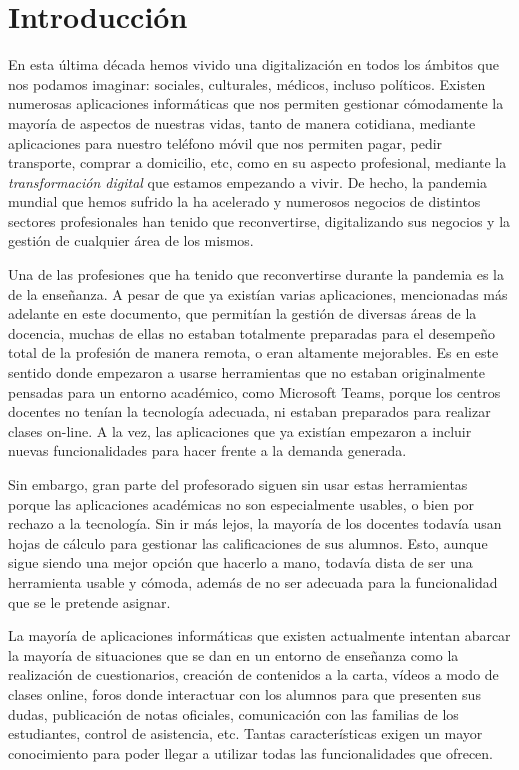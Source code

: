 
\chapter{Introducción}
\label{cap:Introduccion}
En esta última década hemos vivido una digitalización en todos los ámbitos que nos podamos imaginar: sociales, culturales, médicos, incluso políticos. Existen numerosas aplicaciones informáticas que nos permiten gestionar cómodamente la mayoría de aspectos de nuestras vidas, tanto de manera cotidiana, mediante aplicaciones para nuestro teléfono móvil que nos permiten pagar, pedir transporte, comprar a domicilio, etc, como en su aspecto profesional, mediante la \textit{transformación digital} que estamos empezando a vivir. De hecho, la pandemia mundial que hemos sufrido la ha acelerado y numerosos negocios de distintos sectores profesionales han tenido que reconvertirse, digitalizando sus negocios y la gestión de cualquier área de los mismos.

Una de las profesiones que ha tenido que reconvertirse durante la pandemia es la de la enseñanza. A pesar de que ya existían varias aplicaciones, mencionadas más adelante en este documento, que permitían la gestión de diversas áreas de la docencia, muchas de ellas no estaban totalmente preparadas para el desempeño total de la profesión de manera remota, o eran altamente mejorables. Es en este sentido donde empezaron a usarse herramientas que no estaban originalmente pensadas para un entorno académico, como Microsoft Teams, porque los centros docentes no tenían la tecnología adecuada, ni estaban preparados para realizar clases on-line\cite{fletcher2020digital}. A la vez, las aplicaciones que ya existían empezaron a incluir nuevas funcionalidades para hacer frente a la demanda generada.

Sin embargo, gran parte del profesorado siguen sin usar estas herramientas porque las aplicaciones académicas no son especialmente usables, o bien por rechazo a la tecnología. Sin ir más lejos, la mayoría de los docentes todavía usan hojas de cálculo para gestionar las calificaciones de sus alumnos. Esto, aunque sigue siendo una mejor opción que hacerlo a mano, todavía dista de ser una herramienta usable y cómoda, además de no ser adecuada para la funcionalidad que se le pretende asignar.

La mayoría de aplicaciones informáticas que existen actualmente intentan abarcar la mayoría de situaciones que se dan en un entorno de enseñanza como la realización de cuestionarios, creación de contenidos a la carta, vídeos a modo de clases online, foros donde interactuar con los alumnos para que presenten sus dudas, publicación de notas oficiales, comunicación con las familias de los estudiantes, control de asistencia, etc. Tantas características exigen un mayor conocimiento para poder llegar a utilizar todas las funcionalidades que ofrecen.


